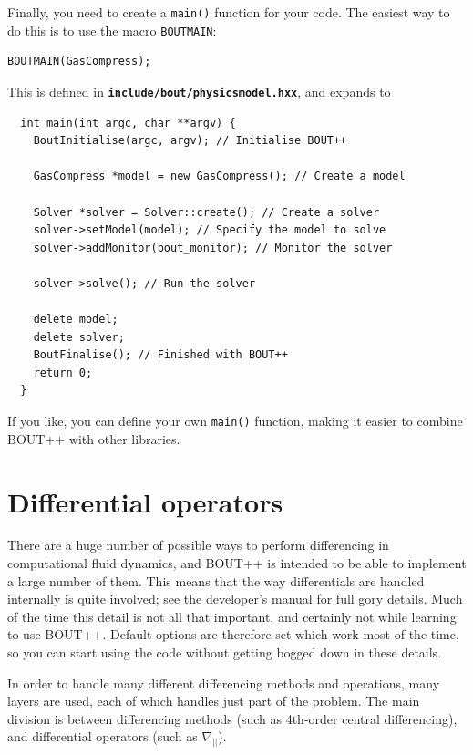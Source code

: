 \documentclass[12pt]{article}
\newcommand{\file}[1]{\texttt{\bf #1}}
\begin{document}
Finally, you need to create a \lstinline!main()! function for your code. The easiest way to do this
is to use the macro \lstinline!BOUTMAIN!:
\begin{lstlisting}
BOUTMAIN(GasCompress);
\end{lstlisting}
This is defined in \file{include/bout/physicsmodel.hxx}, and expands to
\begin{lstlisting}
  int main(int argc, char **argv) {
    BoutInitialise(argc, argv); // Initialise BOUT++
    
    GasCompress *model = new GasCompress(); // Create a model
    
    Solver *solver = Solver::create(); // Create a solver
    solver->setModel(model); // Specify the model to solve
    solver->addMonitor(bout_monitor); // Monitor the solver
    
    solver->solve(); // Run the solver
    
    delete model;
    delete solver;
    BoutFinalise(); // Finished with BOUT++
    return 0;
  }
\end{lstlisting}
If you like, you can define your own \lstinline!main()! function, making it easier to combine
BOUT++ with other libraries. 

\section{Differential operators}
\label{sec:diffops}

There are a huge number of possible ways to perform differencing in computational
fluid dynamics, and BOUT++ is intended to be able to implement a large number of them. This
means that the way differentials are handled internally is quite involved; see the
developer's manual for full gory details. Much of the time this detail is not all that
important, and certainly not while learning to use BOUT++. Default options are
therefore set which work most of the time, so you can start using the code without
getting bogged down in these details.

In order to handle many different differencing methods and operations, many layers are
used, each of which handles just part of the problem. The main division is between
differencing methods (such as 4th-order central differencing), and differential operators
(such as $\nabla_{||}$).
\end{document}
